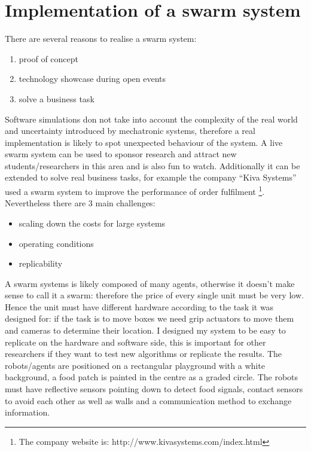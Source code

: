 \section{Implementation of a swarm system \label{Appendix:RobotSystem}}

There are several reasons to realise a swarm system:
\begin{enumerate}
 \item proof of concept
 \item technology showcase during open events
 \item solve a business task
\end{enumerate}
Software simulations don not take into account the complexity of the real world
and uncertainty introduced by mechatronic systems, therefore a real implementation
 is likely to spot unexpected behaviour of the system.
A live swarm system can be used to sponsor research and attract new students/researchers
 in this area and is also fun to watch.
Additionally it can be extended to solve real business tasks, for example the
company ``Kiva Systems'' used a swarm system to improve the performance
of order fulfilment \footnote{The company website is: http://www.kivasystems.com/index.html}.
Nevertheless there are 3 main challenges:
\begin{itemize}
 \item scaling down the costs for large systems
 \item operating conditions
 \item replicability
\end{itemize}
A swarm systems is likely composed of many agents, otherwise it doesn't make
sense to call it a swarm: therefore the price of every single unit must be very low.
Hence the unit must have different hardware according to the task it was designed for:
if the task is to move boxes we need grip actuators to move them and
cameras to determine their location.
I designed my system to be easy to replicate on the hardware and software side,
this is important for other researchers if they want to test new algorithms or
replicate the results.
The robots/agents are positioned on a rectangular playground with a white background,
 a food patch is painted in the centre as a graded circle. The robots must have
reflective sensors pointing down to detect food signals, contact sensors to avoid
each other as well as walls and a communication method to exchange information.

